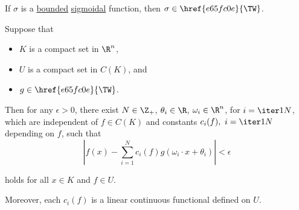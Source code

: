 \Theorem{}\label{e15c3fb}

If $\sigma$ is a \href{e4698be}{bounded} \href{cf39bf4}{sigmoidal} function,
then $\sigma\in\href{e65fc0e}{\TW}$.

\Theorem{}\label{b3b68fd}

Suppose that
\begin{itemize}
  \item $K$ is a compact set in $\R^n$,
  \item $U$ is a compact set in $C(K)$, and
  \item $g\in\href{e65fc0e}{\TW}$.
\end{itemize}

Then for any $\epsilon>0$, there exist $N\in\Z_+$, $\theta_i\in\R$,
$\omega_i\in\R^n$, for $i=\iter1N$, which are independent of $f\in C(K)$ and
constants $c_i(f),\ i=\iter1N$ depending on $f$, such that
\begin{equation*}
  \left|f(x)-\sum_{i=1}^Nc_i(f)g(\omega_i\cdot x+\theta_i)\right|<\epsilon
\end{equation*}

holds for all $x\in K$ and $f\in U$.

Moreover, each $c_i(f)$ is a linear continuous functional defined on $U$.
